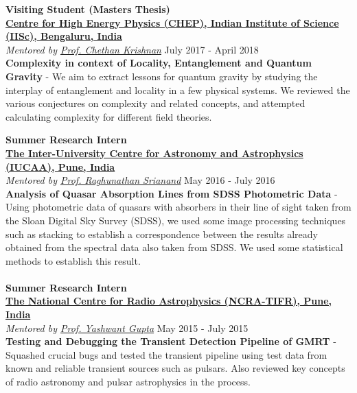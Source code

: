 \documentclass[margin, centered]{res}
\begin{document}
\begin{resume}
\textbf{Visiting Student (Masters Thesis)}
\\
\textbf{\href{http://chep.iisc.ac.in/}{Centre for High Energy Physics (CHEP), Indian Institute of Science (IISc), Bengaluru, India}}\\
\emph{Mentored by \href{http://chep.iisc.ac.in/Personnel/pages/chethan/index.html}{Prof. Chethan Krishnan}} \hfill July 2017 - April 2018\\
\textbf{Complexity in context of Locality, Entanglement and Quantum Gravity} - We aim to extract lessons for quantum gravity by studying the interplay of entanglement and locality in a few physical systems. We reviewed the various conjectures on complexity and related concepts, and attempted calculating complexity for different field theories.

\textbf{Summer Research Intern}
\\
\textbf{\href{http://www.iucaa.ernet.in/}{The Inter-University Centre for Astronomy and Astrophysics (IUCAA), Pune, India}}
\\
\emph{Mentored by \href{http://www.iucaa.ernet.in/~anand/}{Prof. Raghunathan Srianand}} \hfill May 2016 - July 2016\\
\textbf{Analysis of Quasar Absorption Lines from SDSS Photometric Data} - Using photometric data of quasars with absorbers in their line of sight taken from the Sloan Digital Sky Survey (SDSS), we used some image processing techniques such as stacking to establish a correspondence between the results already obtained from the spectral data also taken from SDSS. We used some statistical methods to establish this result. \\
\\
\textbf{Summer Research Intern}\\
\textbf{\href{http://www.ncra.tifr.res.in/}{The National Centre for Radio Astrophysics (NCRA-TIFR), Pune, India}}\\
\emph{Mentored by \href{http://www.ncra.tifr.res.in/ncra/people/academic/ncra-faculty/Yashwant_Gupta}{Prof. Yashwant Gupta}} \hfill May 2015 - July 2015\\
\textbf{Testing and Debugging the Transient Detection Pipeline of GMRT} - Squashed crucial bugs and tested the transient pipeline using test data from known and reliable transient sources such as pulsars. Also reviewed key concepts of radio astronomy and pulsar astrophysics in the process.



\end{resume}
\end{document}
